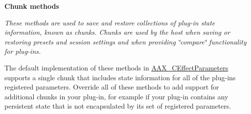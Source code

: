 \begin{Indent}{\bf Chunk methods}\par
{\em These methods are used to save and restore collections of plug-\/in state information, known as chunks. Chunks are used by the host when saving or restoring presets and session settings and when providing \char`\"{}compare\char`\"{} functionality for plug-\/ins.

The default implementation of these methods in \hyperlink{a00018}{A\+A\+X\+\_\+\+C\+Effect\+Parameters} supports a single chunk that includes state information for all of the plug-\/in\textquotesingle{}s registered parameters. Override all of these methods to add support for additional chunks in your plug-\/in, for example if your plug-\/in contains any persistent state that is not encapsulated by its set of registered parameters.

}
\end{Indent}
